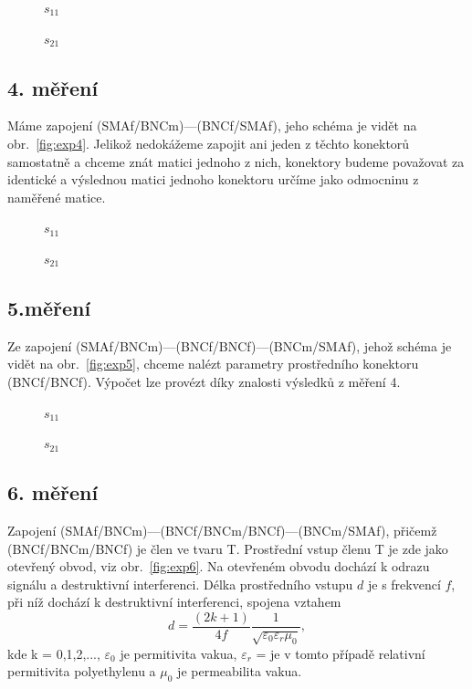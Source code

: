 \documentclass{protokol}
\begin{document}
\begin{figure}[htp]
	\centering
	
	\caption{$s_{11}$}
	\label{fig:03-s11}
\end{figure}

\begin{figure}[htp]
	\centering
	
	\caption{$s_{21}$}
	\label{fig:03-s21}
\end{figure}

\subsection{4. měření}
Máme zapojení (SMAf/BNCm)---(BNCf/SMAf),
jeho schéma je vidět na obr.~\ref{fig:exp4}.
Jelikož nedokážeme zapojit ani jeden z těchto konektorů samostatně
a chceme znát matici jednoho z nich,
konektory budeme považovat za identické a výslednou matici
jednoho konektoru určíme jako odmocninu z naměřené matice.

\begin{figure}[htp]
	\centering
	
	\caption{$s_{11}$}
	\label{fig:04-s11}
\end{figure}

\begin{figure}[htp]
	\centering
	
	\caption{$s_{21}$}
	\label{fig:04-s21}
\end{figure}


\subsection{5.měření}
Ze zapojení (SMAf/BNCm)---(BNCf/BNCf)---(BNCm/SMAf),
jehož schéma je vidět na obr.~\ref{fig:exp5},
chceme nalézt parametry prostředního konektoru (BNCf/BNCf).
Výpočet lze provézt díky znalosti výsledků z měření 4.

\begin{figure}[htp]
	\centering
	
	\caption{$s_{11}$}
	\label{fig:05-s11}
\end{figure}

\begin{figure}[htp]
	\centering
	
	\caption{$s_{21}$}
	\label{fig:05-s21}
\end{figure}

\subsection{6. měření}
Zapojení (SMAf/BNCm)---(BNCf/BNCm/BNCf)---(BNCm/SMAf),
přičemž (BNCf/BNCm/BNCf) je člen ve tvaru T.
Prostřední vstup členu T je zde jako otevřený obvod, viz obr.~\ref{fig:exp6}.
Na otevřeném obvodu dochází k odrazu signálu a destruktivní interferenci.
Délka prostředního vstupu $d$ je s frekvencí $f$,
při níž dochází k destruktivní interferenci, spojena vztahem
\begin{equation}
	d = \frac{(2k+1)}{4f} \frac{1}{\sqrt{\varepsilon_0 \varepsilon_r \mu_0}},
\end{equation}
kde k = 0,1,2,..., $\varepsilon_0$ je permitivita vakua,
$\varepsilon_r$ = je v tomto případě relativní permitivita polyethylenu
a $\mu_0$ je permeabilita vakua.
\end{document}
